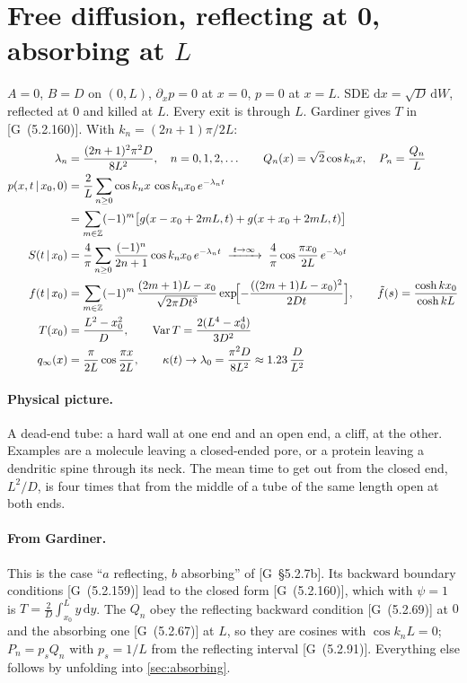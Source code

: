 \documentclass[11pt]{article}
\numberwithin{equation}{section}
\newcommand{\dd}{\mathrm{d}}
\newcommand{\given}{\,|\,}
\newcommand{\G}[1]{[G~(#1)]}
\newcommand{\Gs}[1]{[G~\S#1]}
\begin{document}
\section{Free diffusion, reflecting at 0, absorbing at \texorpdfstring{$L$}{L}}
\label{sec:mixed}

\begin{keyresults}
$A=0$, $B=D$ on $(0,L)$, $\partial_xp=0$ at $x=0$, $p=0$ at $x=L$. SDE $\dd x=\sqrt D\,\dd W$, reflected
at $0$ and killed at $L$. Every exit is through $L$. Gardiner gives $T$ in \G{5.2.160}. With $k_n=(2n+1)\pi/2L$:
\begin{align}
  \lambda_n &= \frac{(2n+1)^2\pi^2D}{8L^2},\quad n=0,1,2,\dots \qquad
  Q_n(x)=\sqrt2\cos k_nx,\quad P_n=\frac{Q_n}L \\
  p(x,t\given x_0,0) &= \frac2L\sum_{n\ge0}\cos k_nx\,\cos k_nx_0\,e^{-\lambda_nt} \notag\\
  &= \sum_{m\in\mathbb Z}(-1)^m\bigl[g(x-x_0+2mL,t)+g(x+x_0+2mL,t)\bigr] \label{eq:M-prop}\\
  S(t\given x_0) &= \frac4\pi\sum_{n\ge0}\frac{(-1)^n}{2n+1}\cos k_nx_0\,e^{-\lambda_nt}
  \;\xrightarrow{\;t\to\infty\;}\; \frac4\pi\cos\frac{\pi x_0}{2L}\,e^{-\lambda_0t} \\
  f(t\given x_0) &= \sum_{m\in\mathbb Z}(-1)^m\,\frac{(2m+1)L-x_0}{\sqrt{2\pi Dt^3}}
  \exp\!\Bigl[-\frac{((2m+1)L-x_0)^2}{2Dt}\Bigr],\qquad
  \tilde f(s)=\frac{\cosh kx_0}{\cosh kL} \label{eq:M-flux}\\
  T(x_0) &= \frac{L^2-x_0^2}{D},\qquad \operatorname{Var}T=\frac{2(L^4-x_0^4)}{3D^2} \\
  q_\infty(x) &= \frac{\pi}{2L}\cos\frac{\pi x}{2L},\qquad
  \kappa(t)\to\lambda_0=\frac{\pi^2D}{8L^2}\approx1.23\,\frac{D}{L^2}
\end{align}
\end{keyresults}

\paragraph{Physical picture.} A dead-end tube: a hard wall at one end and an open end, a cliff, at the other.
Examples are a molecule leaving a closed-ended pore, or a protein leaving a dendritic spine through its neck. The
mean time to get out from the closed end, $L^2/D$, is four times that from the middle of a tube of the same
length open at both ends.

\paragraph{From Gardiner.} This is the case ``$a$ reflecting, $b$ absorbing'' of \Gs{5.2.7b}. Its backward
boundary conditions \G{5.2.159} lead to the closed form \G{5.2.160}, which with $\psi=1$ is
$T=\frac2D\int_{x_0}^L y\,\dd y$. The $Q_n$ obey the reflecting backward condition \G{5.2.69} at $0$
and the absorbing one \G{5.2.67} at $L$, so they are cosines with $\cos k_nL=0$; $P_n=p_sQ_n$ with $p_s=1/L$ from
the reflecting interval \G{5.2.91}. Everything else follows by unfolding into \cref{sec:absorbing}.
\end{document}
